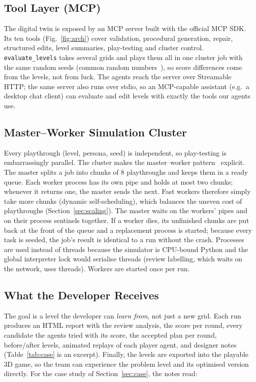 \documentclass[conference]{IEEEtran}
\begin{document}
\subsection{Tool Layer (MCP)}
The digital twin is exposed by an MCP server built with the official MCP SDK. Its ten tools
(Fig.~\ref{fig:arch}) cover validation, procedural generation, repair, structured edits, level
summaries, play-testing and cluster control. \texttt{evaluate\_levels} takes several grids and
plays them all in one cluster job with the same random seeds (common random
numbers~\cite{law2015simulation}), so score differences come from the levels, not from luck. The
agents reach the server over Streamable HTTP; the same server also runs over stdio, so an MCP-capable
assistant (e.g.\ a desktop chat client) can evaluate and edit levels with exactly the tools our
agents use.

\subsection{Master--Worker Simulation Cluster}
Every playthrough (level, persona, seed) is independent, so play-testing is embarrassingly parallel.
The cluster makes the master--worker pattern~\cite{mattson2004patterns} explicit. The master splits a
job into chunks of 8 playthroughs and keeps them in a ready queue. Each worker process has its own
pipe and holds at most two chunks; whenever it returns one, the master sends the next. Fast workers
therefore simply take more chunks (dynamic self-scheduling), which balances the uneven cost of
playthroughs (Section~\ref{sec:scaling}). The master waits on the workers' pipes and on their process
sentinels together. If a worker dies, its unfinished chunks are put back at the front of the queue
and a replacement process is started; because every task is seeded, the job's result is identical
to a run without the crash. Processes are used instead of threads because the simulator is
CPU-bound Python and the global interpreter lock would serialise threads (review labelling, which
waits on the network, uses threads). Workers are started once per run.

\subsection{What the Developer Receives}
The goal is a level the developer can \emph{learn from}, not just a new grid. Each run produces an
HTML report with the review analysis, the score per round, every candidate the agents tried with its
score, the accepted plan per round, before/after levels, animated replays of each player agent, and
designer notes (Table~\ref{tab:case} is an excerpt). Finally, the levels are exported into the
playable 3D game, so the team can experience the problem level and its optimised version directly.
For the case study of Section~\ref{sec:case}, the notes read:
\end{document}
